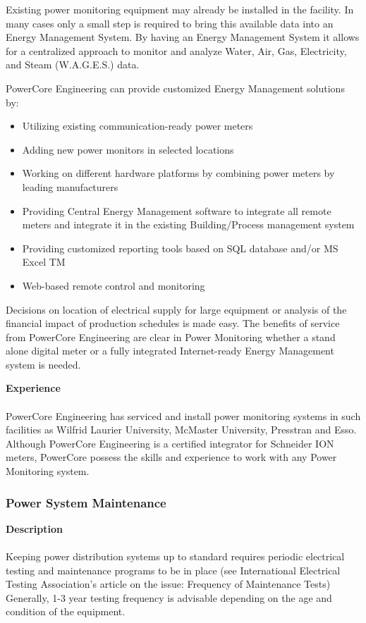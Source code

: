 Existing power monitoring equipment may already be installed in the facility. In many cases only a small step is required to bring this available data into an Energy Management System. By having an Energy Management System it allows for a centralized approach to monitor and analyze Water, Air, Gas, Electricity, and Steam (W.A.G.E.S.) data. 

PowerCore Engineering can provide customized Energy Management solutions by: 
\begin{itemize}
	\item Utilizing existing communication-ready power meters
	\item Adding new power monitors in selected locations
	\item Working on different hardware platforms by combining power meters by leading manufacturers
	\item Providing Central Energy Management software to integrate all remote meters and integrate it in the existing Building/Process management system
	\item Providing customized reporting tools based on SQL database and/or MS Excel TM
	\item Web-based remote control and monitoring

\end{itemize}


Decisions on location of electrical supply for large equipment or analysis of the financial impact of production schedules is made easy. The benefits of service from PowerCore Engineering are clear in Power Monitoring whether a stand alone digital meter or a fully integrated Internet-ready Energy Management system is needed. 

\textbf{Experience}\\
\\	
PowerCore Engineering has serviced and install power monitoring systems in such facilities as Wilfrid Laurier University, McMaster University, Presstran and Esso.  Although PowerCore Engineering is a certified integrator for Schneider ION meters, PowerCore possess the skills and experience to work with any Power Monitoring system.


\subsubsection{Power System Maintenance}
\label{Sub:Exp:PSM}

\textbf{Description}\\
\\	 
Keeping power distribution systems up to standard requires periodic electrical testing and maintenance programs to be in place (see International Electrical Testing Association's article on the issue: Frequency of Maintenance Tests) Generally, 1-3 year testing frequency is advisable depending on the age and condition of the equipment. 

